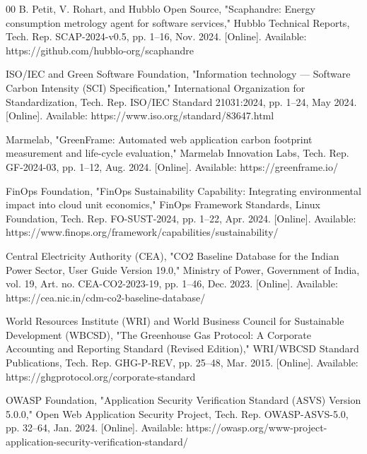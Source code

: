 \documentclass[conference]{IEEEtran}
\begin{document}
\begin{thebibliography}{00}
B. Petit, V. Rohart, and Hubblo Open Source, "Scaphandre: Energy consumption metrology agent for software services," Hubblo Technical Reports, Tech. Rep. SCAP-2024-v0.5, pp. 1–16, Nov. 2024. [Online]. Available: https://github.com/hubblo-org/scaphandre

ISO/IEC and Green Software Foundation, "Information technology — Software Carbon Intensity (SCI) Specification," International Organization for Standardization, Tech. Rep. ISO/IEC Standard 21031:2024, pp. 1–24, May 2024. [Online]. Available: https://www.iso.org/standard/83647.html

Marmelab, "GreenFrame: Automated web application carbon footprint measurement and life-cycle evaluation," Marmelab Innovation Labs, Tech. Rep. GF-2024-03, pp. 1–12, Aug. 2024. [Online]. Available: https://greenframe.io/

FinOps Foundation, "FinOps Sustainability Capability: Integrating environmental impact into cloud unit economics," FinOps Framework Standards, Linux Foundation, Tech. Rep. FO-SUST-2024, pp. 1–22, Apr. 2024. [Online]. Available: https://www.finops.org/framework/capabilities/sustainability/

Central Electricity Authority (CEA), "CO2 Baseline Database for the Indian Power Sector, User Guide Version 19.0," Ministry of Power, Government of India, vol. 19, Art. no. CEA-CO2-2023-19, pp. 1–46, Dec. 2023. [Online]. Available: https://cea.nic.in/cdm-co2-baseline-database/

World Resources Institute (WRI) and World Business Council for Sustainable Development (WBCSD), "The Greenhouse Gas Protocol: A Corporate Accounting and Reporting Standard (Revised Edition)," WRI/WBCSD Standard Publications, Tech. Rep. GHG-P-REV, pp. 25–48, Mar. 2015. [Online]. Available: https://ghgprotocol.org/corporate-standard

OWASP Foundation, "Application Security Verification Standard (ASVS) Version 5.0.0," Open Web Application Security Project, Tech. Rep. OWASP-ASVS-5.0, pp. 32–64, Jan. 2024. [Online]. Available: https://owasp.org/www-project-application-security-verification-standard/
\end{thebibliography}
\end{document}
